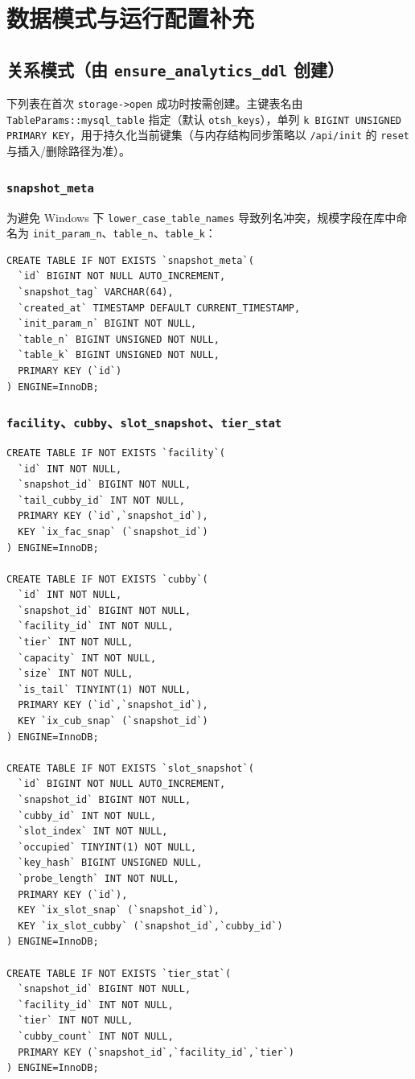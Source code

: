 \chapter{数据模式与运行配置补充}
\label{app:api}

\section{关系模式（由 \texttt{ensure\_analytics\_ddl} 创建）}
下列表在首次 \texttt{storage->open} 成功时按需创建。主键表名由 \texttt{TableParams::mysql\_table} 指定（默认 \texttt{otsh\_keys}），单列 \texttt{k BIGINT UNSIGNED PRIMARY KEY}，用于持久化当前键集（与内存结构同步策略以 \texttt{/api/init} 的 \texttt{reset} 与插入/删除路径为准）。

\subsection{\texttt{snapshot\_meta}}
为避免 Windows 下 \texttt{lower\_case\_table\_names} 导致列名冲突，规模字段在库中命名为 \texttt{init\_param\_n}、\texttt{table\_n}、\texttt{table\_k}：
\begin{verbatim}
CREATE TABLE IF NOT EXISTS `snapshot_meta`(
  `id` BIGINT NOT NULL AUTO_INCREMENT,
  `snapshot_tag` VARCHAR(64),
  `created_at` TIMESTAMP DEFAULT CURRENT_TIMESTAMP,
  `init_param_n` BIGINT NOT NULL,
  `table_n` BIGINT UNSIGNED NOT NULL,
  `table_k` BIGINT UNSIGNED NOT NULL,
  PRIMARY KEY (`id`)
) ENGINE=InnoDB;
\end{verbatim}

\subsection{\texttt{facility}、\texttt{cubby}、\texttt{slot\_snapshot}、\texttt{tier\_stat}}
\begin{verbatim}
CREATE TABLE IF NOT EXISTS `facility`(
  `id` INT NOT NULL,
  `snapshot_id` BIGINT NOT NULL,
  `tail_cubby_id` INT NOT NULL,
  PRIMARY KEY (`id`,`snapshot_id`),
  KEY `ix_fac_snap` (`snapshot_id`)
) ENGINE=InnoDB;

CREATE TABLE IF NOT EXISTS `cubby`(
  `id` INT NOT NULL,
  `snapshot_id` BIGINT NOT NULL,
  `facility_id` INT NOT NULL,
  `tier` INT NOT NULL,
  `capacity` INT NOT NULL,
  `size` INT NOT NULL,
  `is_tail` TINYINT(1) NOT NULL,
  PRIMARY KEY (`id`,`snapshot_id`),
  KEY `ix_cub_snap` (`snapshot_id`)
) ENGINE=InnoDB;

CREATE TABLE IF NOT EXISTS `slot_snapshot`(
  `id` BIGINT NOT NULL AUTO_INCREMENT,
  `snapshot_id` BIGINT NOT NULL,
  `cubby_id` INT NOT NULL,
  `slot_index` INT NOT NULL,
  `occupied` TINYINT(1) NOT NULL,
  `key_hash` BIGINT UNSIGNED NULL,
  `probe_length` INT NOT NULL,
  PRIMARY KEY (`id`),
  KEY `ix_slot_snap` (`snapshot_id`),
  KEY `ix_slot_cubby` (`snapshot_id`,`cubby_id`)
) ENGINE=InnoDB;

CREATE TABLE IF NOT EXISTS `tier_stat`(
  `snapshot_id` BIGINT NOT NULL,
  `facility_id` INT NOT NULL,
  `tier` INT NOT NULL,
  `cubby_count` INT NOT NULL,
  PRIMARY KEY (`snapshot_id`,`facility_id`,`tier`)
) ENGINE=InnoDB;
\end{verbatim}

